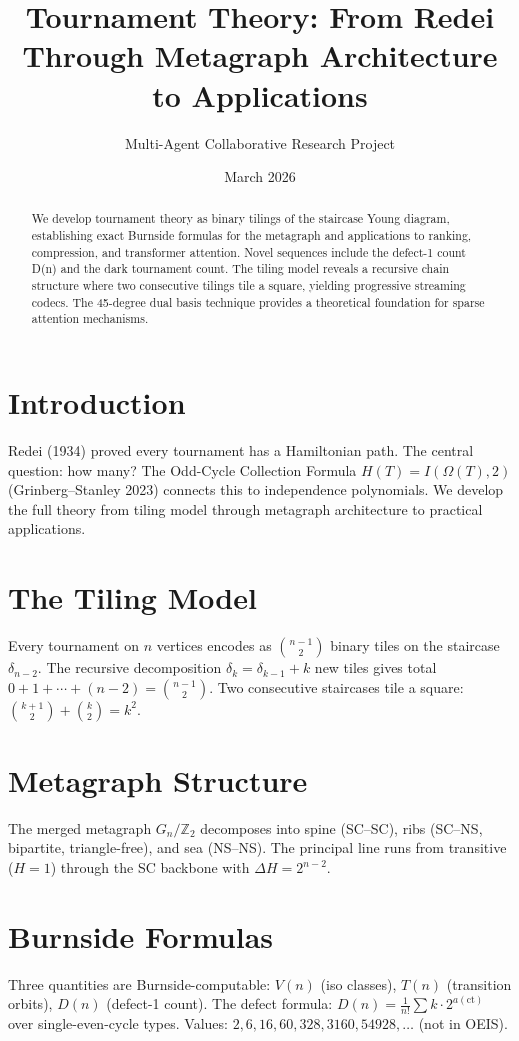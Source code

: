 \documentclass[12pt,reqno]{amsart}
\title[Tournament Theory]{Tournament Theory: From Redei Through Metagraph Architecture to Applications}
\author{Multi-Agent Collaborative Research Project}
\date{March 2026}
\theoremstyle{plain}
\theoremstyle{definition}
\theoremstyle{remark}
\begin{document}
\begin{abstract}
We develop tournament theory as binary tilings of the staircase Young diagram, establishing exact Burnside formulas for the metagraph and applications to ranking, compression, and transformer attention. Novel sequences include the defect-1 count D(n) and the dark tournament count. The tiling model reveals a recursive chain structure where two consecutive tilings tile a square, yielding progressive streaming codecs. The 45-degree dual basis technique provides a theoretical foundation for sparse attention mechanisms.
\end{abstract}

\maketitle
\tableofcontents

\section{Introduction}
Redei (1934) proved every tournament has a Hamiltonian path. The central question: how many? The Odd-Cycle Collection Formula \(H(T) = I(\Omega(T), 2)\) (Grinberg--Stanley 2023) connects this to independence polynomials. We develop the full theory from tiling model through metagraph architecture to practical applications.

\section{The Tiling Model}
Every tournament on \(n\) vertices encodes as \(\binom{n-1}{2}\) binary tiles on the staircase \(\delta_{n-2}\). The recursive decomposition \(\delta_k = \delta_{k-1} + k\) new tiles gives total \(0+1+\cdots+(n-2) = \binom{n-1}{2}\). Two consecutive staircases tile a square: \(\binom{k+1}{2} + \binom{k}{2} = k^2\).

\section{Metagraph Structure}
The merged metagraph \(G_n/\mathbb{Z}_2\) decomposes into spine (SC--SC), ribs (SC--NS, bipartite, triangle-free), and sea (NS--NS). The principal line runs from transitive (\(H=1\)) through the SC backbone with \(\Delta H = 2^{n-2}\).

\section{Burnside Formulas}
Three quantities are Burnside-computable: \(V(n)\) (iso classes), \(T(n)\) (transition orbits), \(D(n)\) (defect-1 count). The defect formula: \(D(n) = \frac{1}{n!}\sum k \cdot 2^{a(\text{ct})}\) over single-even-cycle types. Values: \(2, 6, 16, 60, 328, 3160, 54928, \ldots\) (not in OEIS).
\end{document}
